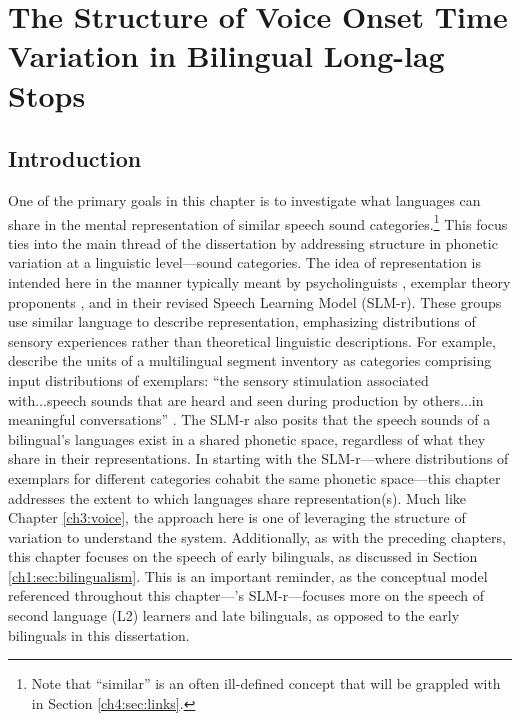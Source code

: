 \setcounter{chapter}{3}
\chapter{The Structure of Voice Onset Time Variation in Bilingual Long-lag Stops}\label{ch4:uniformity}

\section{Introduction}\label{ch4:sec:intro}

One of the primary goals in this chapter is to investigate what languages can share in the mental representation of similar speech sound categories.\footnote{Note that ``similar'' is an often ill-defined concept that will be grappled with in Section \ref{ch4:sec:links}.} This focus ties into the main thread of the dissertation by addressing structure in phonetic variation at a linguistic level---sound categories. The idea of representation is intended here in the manner typically meant by psycholinguists \citep[e.g.,][]{llompart_2018_acoustic}, exemplar theory proponents \citep[e.g.,][]{amengual_2018_laterals}, and \citet{flege_2021_slmr} in their revised Speech Learning Model (SLM-r). These groups use similar language to describe representation, emphasizing distributions of sensory experiences rather than theoretical linguistic descriptions. For example, \citeauthor{flege_2021_slmr} describe the units of a multilingual segment inventory as categories comprising input distributions of exemplars: ``the sensory stimulation associated with...speech sounds that are heard and seen during production by others...in meaningful conversations'' \citeyearpar[][p. 32]{flege_2021_slmr}. The SLM-r also posits that the speech sounds of a bilingual's languages exist in a shared phonetic space, regardless of what they share in their representations. In starting with the SLM-r---where distributions of exemplars for different categories cohabit the same phonetic space---this chapter addresses the extent to which languages share representation(s). Much like Chapter \ref{ch3:voice}, the approach here is one of leveraging the structure of variation to understand the system. Additionally, as with the preceding chapters, this chapter focuses on the speech of early bilinguals, as discussed in Section \ref{ch1:sec:bilingualism}. This is an important reminder, as the conceptual model referenced throughout this chapter---\citeauthor{flege_2021_slmr}'s \citeyearpar{flege_2021_slmr} SLM-r---focuses more on the speech of second language (L2) learners and late bilinguals, as opposed to the early bilinguals in this dissertation. 

